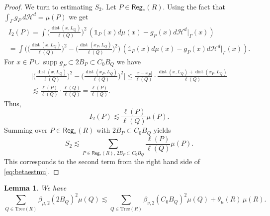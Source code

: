 \documentclass[11pt,reqno]{amsart}
\newcommand{\Tr}{\mathrm{Tree}}
\def\one{\mathds{1}}
\def\dist{\mathop\mathrm{dist}} 						%
\newcommand{\fr}[2]{\frac{#1}{#2}}
\newtheorem{lemma}[theorem]{Lemma}
\theoremstyle{definition}
\theoremstyle{remark}
\numberwithin{equation}{section}
\newcommand{\hd}{\mathcal{H}^d}
\newcommand{\Reg}{\mathsf{Reg}_*}
\DeclareMathOperator{\supp}{supp}
\theoremstyle{theorem}
\theoremstyle{definition}
\theoremstyle{remark}
\numberwithin{equation}{section}
\begin{document}
\begin{proof}
		We turn to estimating $S_2$. Let $P\in\Reg(R)$. Using the fact that $\int_\Gamma g_P\, d\hd = \mu(P)$ we get
		\begin{multline*}
		I_2(P)=\int \bigg(\fr{\dist(x,L_Q)}{\ell(Q)}\bigg)^2\, (\one_P(x)d\mu(x)-g_P(x)d\hd|_\Gamma(x))\\
		 = \int \bigg(\bigg(\fr{\dist(x,L_Q)}{\ell(Q)}\bigg)^2 - \bigg(\fr{\dist(x_P,L_Q)}{\ell(Q)}\bigg)^2\bigg)\, (\one_P(x)d\mu(x)-g_P(x)d\hd|_\Gamma(x)).
		\end{multline*}
		For $x\in P\cup\supp g_P\subset 2B_P\subset C_0 B_Q$ we have
		\begin{multline*}
		\bigg|\bigg(\fr{\dist(x,L_Q)}{\ell(Q)}\bigg)^2 - \bigg(\fr{\dist(x_P,L_Q)}{\ell(Q)}\bigg)^2\bigg|
		\le \fr{|x-x_P|}{\ell(Q)}\cdot \fr{\dist(x,L_Q)+\dist(x_P,L_Q)}{\ell(Q)}\\
		\lesssim \fr{\ell(P)}{\ell(Q)}\cdot\fr{\ell(Q)}{\ell(Q)}=\fr{\ell(P)}{\ell(Q)}.
		\end{multline*}
		Thus,
		\begin{equation*}
		I_2(P)\lesssim \fr{\ell(P)}{\ell(Q)}\mu(P).
		\end{equation*}
		Summing over $P\in\Reg(R)$ with $2B_P\subset C_0B_Q$ yields
		\begin{equation*}
		S_2\lesssim\sum_{P\in\Reg(R),\, 2B_P\subset C_0B_Q} \fr{\ell(P)}{\ell(Q)}\mu(P).
		\end{equation*}
		This corresponds to the second term from the right hand side of \eqref{eq:betaestmu}.
	\end{proof}
	\begin{lemma}\label{lem:betasumest}
		We have
		\begin{equation}\label{eq:betasumest}
			\sum_{Q\in\Tr(R)}\beta_{\mu,2}(2B_Q)^2\mu(Q)\lesssim \sum_{Q\in\Tr(R)}\beta_{\nu,2}(C_0B_Q)^2\mu(Q) + \theta_\mu(R)\,\mu(R).
		\end{equation}
	\end{lemma}
\end{document}

